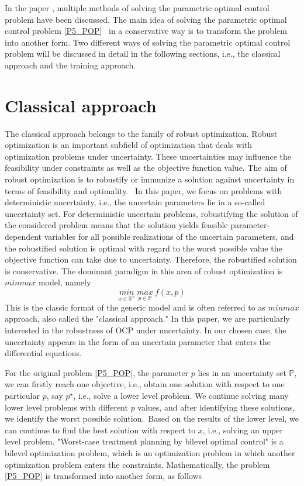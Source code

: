 \documentclass  [
  paper    = a4,
  BCOR     = 10mm,
  twoside,
  fontsize = 12pt,
  fleqn,
  toc      = bibnumbered,
  toc      = listofnumbered,
  numbers  = noendperiod,
  headings = normal,
  listof   = leveldown,
  version  = 3.03
]                                       {scrreprt}
\newcommand{\<}{\langle}
\renewcommand{\>}{\rangle}
\begin{document}
In the paper \cite{MatSch22}, multiple methods of solving the parametric optimal control problem have been discussed. The main idea of solving the parametric optimal control problem \ref{P5_POP}  in a conservative way is to transform the problem into another form. Two different ways of solving the parametric optimal control problem will be discussed in detail in the following sections, i.e., the classical approach and the training approach.

\section{Classical approach}
\label{Sec:CA}

The classical approach belongs to the family of robust optimization. Robust optimization is an important subfield of optimization that deals with optimization problems under uncertainty. These uncertainties may influence the feasibility under constraints as well as the objective function value. The aim of robust optimization is to robustify or immunize a solution against uncertainty in terms of feasibility and optimality.  In this paper, we focus on problems with deterministic uncertainty, i.e., the uncertain parameters lie in a so-called uncertainty set. For deterministic uncertain problems, robustifying the solution of the considered problem means that the solution yields feasible parameter-dependent variables for all possible realizations of the uncertain parameters, and the robustified solution is optimal with regard to the worst possible value the objective function can take due to uncertainty. Therefore, the robustified solution is conservative. The dominant paradigm in this area of robust optimization is $minmax$ model, namely
\begin{equation}
	\underset{x \in \mathbb{R}^n}{min} \   \underset{p \in \mathbb{P}}{max}  \  f(x,p) 
\end{equation}
This is the classic format of the generic model and is often referred to as $minmax$ approach, also called the "classical approach." In this paper, we are particularly interested in the robustness of OCP under uncertainty. In our chosen case, the uncertainty appears in the form of an uncertain parameter that enters the differential equations.

For the original problem \ref{P5_POP}, the parameter $p$ lies in an uncertainty set $ \mathbb{P}$, we can firstly reach one objective, i.e., obtain one solution with respect to one particular $p$, say $p^\star$, i.e., solve a lower level problem. We continue solving many lower level problems with different $p$ values, and after identifying these solutions, we identify the worst possible solution. Based on the results of the lower level, we can continue to find the best solution with respect to $x$, i.e., solving an upper level problem. "Worst-case treatment planning by bilevel optimal control" is a bilevel optimization problem, which is an optimization problem in which another optimization problem enters the constraints. Mathematically, the problem \ref{P5_POP} is transformed into another form, as follows
\end{document}
